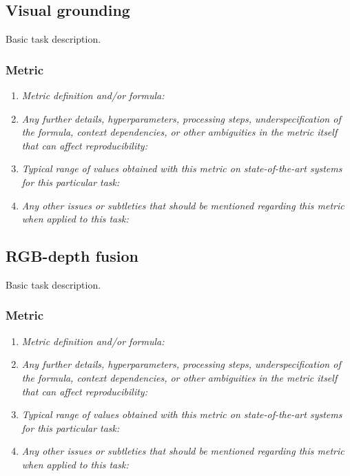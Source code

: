 \documentclass[a4paper,11pt]{article}
\begin{document}
    \subsection{Visual grounding} \label{visual_grounding}
        Basic task description.
        \subsubsection{Metric}
            \begin{enumerate}[label=\alph*.]
                \item \textit{Metric definition and/or formula:}
                \bigskip
                \item \textit{Any further details, hyperparameters, processing steps, underspecification of the formula, context dependencies, or other ambiguities in the metric itself that can affect reproducibility:}
                \bigskip
                \item \textit{Typical range of values obtained with this metric on state-of-the-art systems for this particular task:}
                \bigskip
                \item \textit{Any other issues or subtleties that should be mentioned regarding this metric when applied to this task:}
                \bigskip
            \end{enumerate}

    \subsection{RGB-depth fusion} \label{rgb_depth_fusion}
    Basic task description.
    \subsubsection{Metric}
        \begin{enumerate}[label=\alph*.]
            \item \textit{Metric definition and/or formula:}
            \bigskip
            \item \textit{Any further details, hyperparameters, processing steps, underspecification of the formula, context dependencies, or other ambiguities in the metric itself that can affect reproducibility:}
            \bigskip
            \item \textit{Typical range of values obtained with this metric on state-of-the-art systems for this particular task:}
            \bigskip
            \item \textit{Any other issues or subtleties that should be mentioned regarding this metric when applied to this task:}
            \bigskip
        \end{enumerate}
\end{document}
